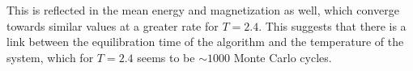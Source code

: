 \documentclass[10pt,showpacs,preprintnumbers,amsmath,amssymb,nofootinbib,aps,prl,twocolumn,groupedaddress,superscriptaddress,showkeys]{revtex4-1}
\begin{document}
  This is reflected in the mean energy and magnetization as well, which converge towards similar values at a greater rate for $T=2.4$. This suggests that there is a link between the equilibration time of the algorithm and the temperature of the system, which for $T=2.4$ seems to be $\sim 1000$ Monte Carlo cycles.





  \begin{figure}[h!p]
    \center
\end{figure}
\end{document}
